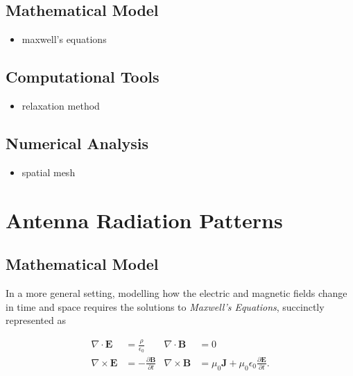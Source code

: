 \documentclass{report}
\begin{document}
        \subsection{Mathematical Model}

            \begin{itemize}
                \item maxwell's equations
            \end{itemize}

        \subsection{Computational Tools}

            \begin{itemize}
                \item relaxation method
            \end{itemize}

        \subsection{Numerical Analysis}

            \begin{itemize}
                \item spatial mesh
            \end{itemize}

\pagebreak

    \section{Antenna Radiation Patterns}

        \subsection{Mathematical Model}

            In a more general setting, modelling how the electric and magnetic fields change in time and space requires the solutions to \emph{Maxwell's Equations}\cite{griffiths2017introduction}, succinctly represented as

            \begin{equation}
            \begin{aligned}
                \nabla \cdot \mathbf{E}  &= \frac{\rho}{\epsilon_0}                 & \nabla \cdot \mathbf{B}  &= 0 \\
                \nabla \times \mathbf{E} &= -\frac{\partial \mathbf{B}}{\partial t} & \nabla \times \mathbf{B} &= \mu_0 \mathbf{J} + \mu_0 \epsilon_0 \frac{\partial \mathbf{E}}{\partial t}.
            \end{aligned}
            \end{equation}
\end{document}
